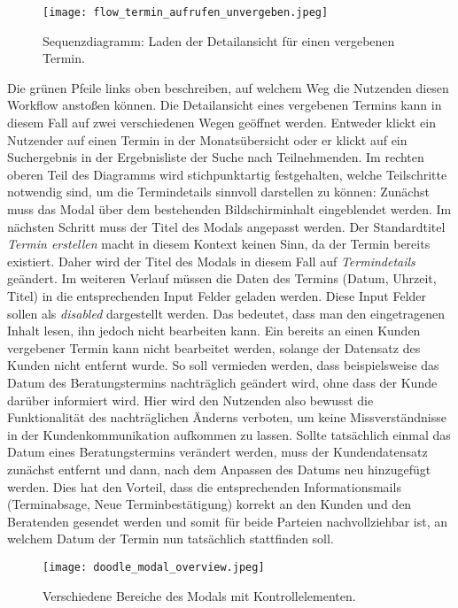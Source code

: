 \begin{figure}[H]
    \caption{Sequenzdiagramm: Laden der Detailansicht für einen vergebenen Termin.}
    \centering
    \texttt{[image: flow\_termin\_aufrufen\_unvergeben.jpeg]}
\end{figure}

Die grünen Pfeile links oben beschreiben, auf welchem Weg die Nutzenden diesen
Workflow anstoßen können. Die Detailansicht eines vergebenen Termins kann in
diesem Fall auf zwei verschiedenen Wegen geöffnet werden. Entweder klickt ein
Nutzender auf einen Termin in der Monatsübersicht oder er klickt auf ein
Suchergebnis in der Ergebnisliste der Suche nach Teilnehmenden. Im rechten
oberen Teil des Diagramms wird stichpunktartig festgehalten, welche
Teilschritte notwendig sind, um die Termindetails sinnvoll darstellen zu können:
Zunächst muss das \gls{Modal} über dem bestehenden Bildschirminhalt
eingeblendet werden. Im nächsten Schritt muss der Titel des Modals angepasst
werden. Der Standardtitel \textit{Termin erstellen} macht in diesem Kontext
keinen Sinn, da der Termin bereits existiert. Daher wird der Titel des Modals
in diesem Fall auf \textit{Termindetails} geändert. Im weiteren Verlauf müssen
die Daten des Termins (Datum, Uhrzeit, Titel) in die entsprechenden Input
Felder geladen werden. Diese Input Felder sollen als \textit{disabled}
dargestellt werden. Das bedeutet, dass man den eingetragenen Inhalt lesen, ihn
jedoch nicht bearbeiten kann. Ein bereits an einen Kunden vergebener Termin
kann nicht bearbeitet werden, solange der Datensatz des Kunden nicht entfernt
wurde. So soll vermieden werden, dass beispielsweise das Datum des
Beratungstermins nachträglich geändert wird, ohne dass der Kunde darüber
informiert wird. Hier wird den Nutzenden also bewusst die Funktionalität des
nachträglichen Änderns verboten, um keine Missverständnisse in der
Kundenkommunikation aufkommen zu lassen. Sollte tatsächlich einmal das Datum
eines Beratungstermins verändert werden, muss der Kundendatensatz zunächst
entfernt und dann, nach dem Anpassen des Datums neu hinzugefügt werden. Dies
hat den Vorteil, dass die entsprechenden Informationsmails (Terminabsage, Neue
Terminbestätigung) korrekt an den Kunden und den Beratenden gesendet werden und
somit für beide Parteien nachvollziehbar ist, an welchem Datum der Termin nun
tatsächlich stattfinden soll.

\begin{figure}[H]
    \caption{Verschiedene Bereiche des Modals mit Kontrollelementen.}
    \centering
    \texttt{[image: doodle\_modal\_overview.jpeg]}
\end{figure}

